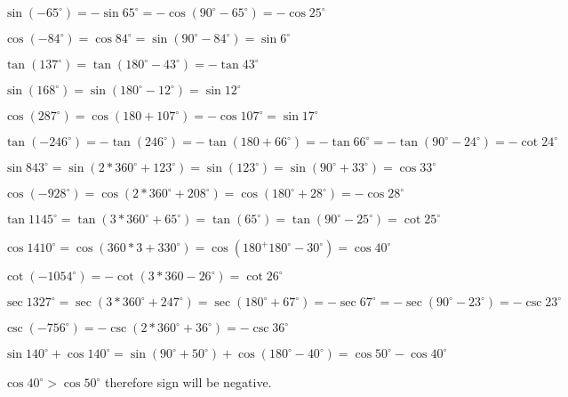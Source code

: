 \item $\sin(-65^\circ) = -\sin 65^\circ = -\cos(90^\circ - 65^\circ) = -\cos 25^\circ$

\item $\cos(-84^\circ) = \cos 84^\circ = \sin(90^\circ - 84^\circ) = \sin 6^\circ$

\item $\tan(137^\circ) = \tan(180^\circ - 43^\circ) = -\tan 43^\circ$

\item $\sin(168^\circ) = \sin(180^\circ - 12^\circ) = \sin 12^\circ$

\item $\cos(287^\circ) = \cos(180 + 107^\circ) = -\cos 107^\circ = \sin 17^\circ$

\item $\tan(-246^\circ) = -\tan(246^\circ) = -\tan(180 + 66^\circ) = -\tan 66^\circ = -\tan(90^\circ - 24^\circ) = -\cot
  24^\circ$

\item $\sin 843^\circ = \sin(2*360^\circ + 123^\circ) = \sin(123^\circ) = \sin(90^\circ + 33^\circ) = \cos 33^\circ$

\item $\cos(-928^\circ) = \cos(2*360^\circ + 208^\circ) = \cos(180^\circ + 28^\circ) = -\cos 28^\circ$

\item $\tan 1145^\circ = \tan(3*360^\circ + 65^\circ) = \tan(65^\circ) = \tan(90^\circ - 25^\circ) = \cot 25^\circ$

\item $\cos 1410^\circ = \cos(360*3 + 330^\circ) = \cos(180^ + 180^\circ - 30^\circ) = \cos 40^\circ$

\item $\cot(-1054^\circ) = -\cot(3*360 - 26^\circ) = \cot 26^\circ$

\item $\sec 1327^\circ = \sec(3*360^\circ + 247^\circ) = \sec(180^\circ + 67^\circ) = -\sec 67^\circ = -\sec(90^\circ -
  23^\circ) = -\csc 23^\circ$

\item $\csc (-756^\circ) = -\csc(2*360^\circ + 36^\circ) = -\csc 36^\circ$

\item $\sin 140^\circ + \cos 140^\circ = \sin(90^\circ + 50^\circ) + \cos(180^\circ - 40^\circ) = \cos 50^\circ - \cos
  40^\circ$

  $\cos 40^\circ > \cos 50^\circ$ therefore sign will be negative.


